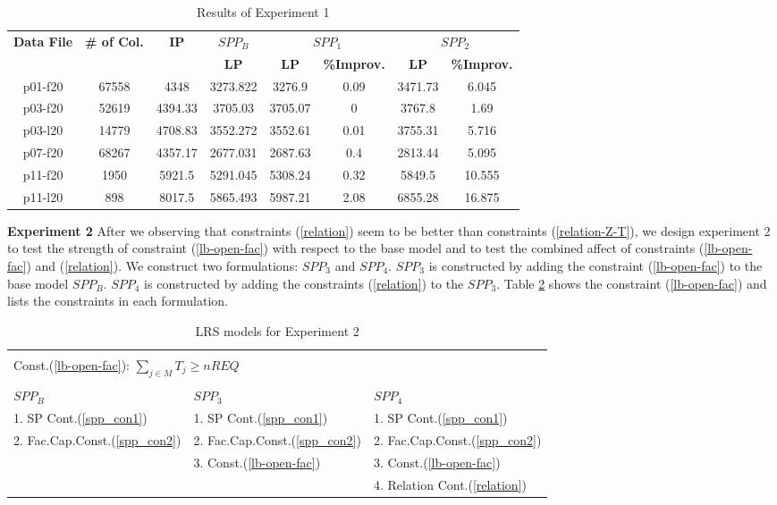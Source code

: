 \begin{table}[h]
\centering
\caption{Results of Experiment 1}\label{lpbounds-gr1}
\begin {tabular}[t]{|c|c|c|c|c|c|c|c|}  
\hline
{\bf Data File} & {\bf \# of Col.} & {\bf IP} & {\bf $SPP_B$}& \multicolumn{2}{|c|}{{\bf $SPP_1$}} & \multicolumn{2}{|c|}{{\bf $SPP_2$}}\\ \cline {4-8}
\mbox{} &  \mbox{} &  \mbox{} &  {\bf LP} & {\bf LP} & {\bf \%Improv.} & {\bf LP} & {\bf \%Improv.} \\\hline
p01-f20	&	67558	&	4348	&	3273.822	&	3276.9	&	0.09	&	3471.73	&	6.045	\\\hline
p03-f20	&	52619	&	4394.33	&	3705.03	&	3705.07	&	0	&	3767.8	& 1.69		\\\hline
p03-l20	&	14779	&	4708.83	&	3552.272	&	3552.61	&	0.01	&	3755.31	&	5.716	\\\hline
p07-f20	&	68267	&	4357.17	&	2677.031	&	2687.63	&	0.4	&	2813.44	&	5.095	\\\hline
p11-f20	&	1950	&	5921.5	&	5291.045	&	5308.24	&	0.32	&	5849.5	&	10.555	\\\hline
p11-l20	&	898	&	8017.5	&	5865.493	&	5987.21	&	2.08	&	6855.28	&	16.875	\\\hline
\end{tabular}
\end{table} 

{\bf Experiment 2} After we observing that constraints (\ref{relation}) seem to be better than constraints 
(\ref{relation-Z-T}), we design experiment 2 to test the strength of constraint (\ref{lb-open-fac}) 
with respect to the base model and to test the combined affect of constraints (\ref{lb-open-fac}) and (\ref{relation}).
We construct two formulations: $SPP_3$ and $SPP_4$. $SPP_3$ is constructed
by adding the constraint (\ref{lb-open-fac}) to the base model $SPP_B$. 
$SPP_4$ is constructed by adding the constraints (\ref{relation}) to the $SPP_3$.
Table \ref{formulations-gr2} shows the constraint (\ref{lb-open-fac}) and lists the constraints in each formulation.   

\begin{table}[h]
\centering
\caption{LRS models for Experiment 2}\label{formulations-gr2}
\begin {tabular}[t]{|l|l|l|}  
\multicolumn{3}{l}{\mbox{}}\\
\multicolumn{3}{l}{Const.(\ref{lb-open-fac}): $\sum_{j \in M} T_{j} \geq nREQ$ }\\
\multicolumn{3}{l}{\mbox{}}\\
\hline
$SPP_B$ & $SPP_3$ & $SPP_4$ \\\hline
1. SP Cont.(\ref{spp_con1}) & 1. SP Cont.(\ref{spp_con1}) & 1. SP Cont.(\ref{spp_con1}) \\
2. Fac.Cap.Const.(\ref{spp_con2}) & 2. Fac.Cap.Const.(\ref{spp_con2}) & 2. Fac.Cap.Const.(\ref{spp_con2}) \\
\mbox{} & 3. Const.(\ref{lb-open-fac})  & 3. Const.(\ref{lb-open-fac}) \\
\mbox{} & \mbox{}  & 4. Relation Cont.(\ref{relation})\\\hline
\end{tabular}
\end{table}

